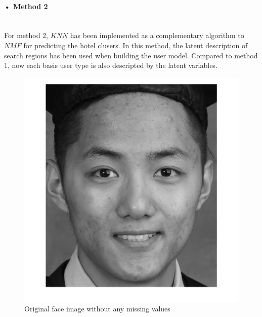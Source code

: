 \documentclass[11pt]{article} %
\begin{document}
\paragraph{• Method 2}\mbox{}\\
For method 2, $KNN$ has been implemented as a complementary algorithm to $NMF$ for predicting the hotel clusers. In this method, the latent description of search regions has been used when building the user model. Compared to method 1, now each basis user type is also descripted by the latent variables.
\begin{figure}[!htb]
  \includegraphics[width=\linewidth]{mySelfieOriginal.png}
  \caption{Original face image without any missing values}\label{fig:selfie1}
\endminipage\hfill
{}%

\end{figure}
\end{document}
